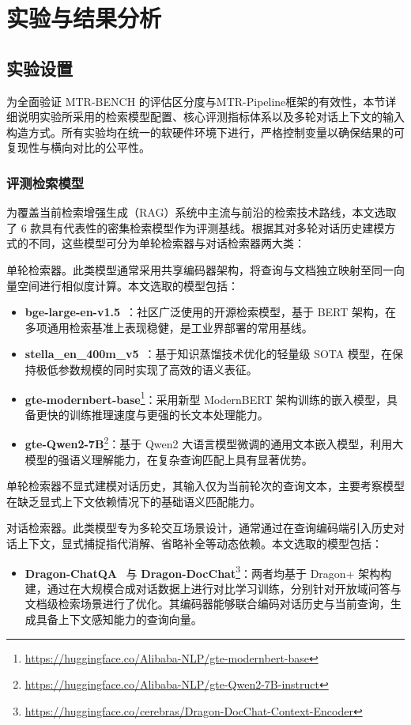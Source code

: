 \chapter{实验与结果分析}

\section{实验设置}
\label{sec:exp_setup}

为全面验证 MTR-BENCH 的评估区分度与MTR-Pipeline框架的有效性，本节详细说明实验所采用的检索模型配置、核心评测指标体系以及多轮对话上下文的输入构造方式。所有实验均在统一的软硬件环境下进行，严格控制变量以确保结果的可复现性与横向对比的公平性。

\subsection{评测检索模型}

为覆盖当前检索增强生成（RAG）系统中主流与前沿的检索技术路线，本文选取了 6 款具有代表性的密集检索模型作为评测基线。根据其对多轮对话历史建模方式的不同，这些模型可分为单轮检索器与对话检索器两大类：

单轮检索器。此类模型通常采用共享编码器架构，将查询与文档独立映射至同一向量空间进行相似度计算。本文选取的模型包括：
\begin{itemize}
    \item \textbf{bge-large-en-v1.5}~\citep{xiao2023cpack}：社区广泛使用的开源检索模型，基于 BERT 架构，在多项通用检索基准上表现稳健，是工业界部署的常用基线。
    \item \textbf{stella\_en\_400m\_v5}~\citep{Zhang2024JasperAS}：基于知识蒸馏技术优化的轻量级 SOTA 模型，在保持极低参数规模的同时实现了高效的语义表征。
    \item \textbf{gte-modernbert-base}\footnote{\url{https://huggingface.co/Alibaba-NLP/gte-modernbert-base}}：采用新型 ModernBERT 架构训练的嵌入模型，具备更快的训练推理速度与更强的长文本处理能力。
    \item \textbf{gte-Qwen2-7B}\footnote{\url{https://huggingface.co/Alibaba-NLP/gte-Qwen2-7B-instruct}}：基于 Qwen2 大语言模型微调的通用文本嵌入模型，利用大模型的强语义理解能力，在复杂查询匹配上具有显著优势。
\end{itemize}

单轮检索器不显式建模对话历史，其输入仅为当前轮次的查询文本，主要考察模型在缺乏显式上下文依赖情况下的基础语义匹配能力。

对话检索器。此类模型专为多轮交互场景设计，通常通过在查询编码端引入历史对话上下文，显式捕捉指代消解、省略补全等动态依赖。本文选取的模型包括：
\begin{itemize}
    \item \textbf{Dragon-ChatQA}~\citep{Liu2024ChatQASG} 与 \textbf{Dragon-DocChat}\footnote{\url{https://huggingface.co/cerebras/Dragon-DocChat-Context-Encoder}}：两者均基于 Dragon+ 架构构建，通过在大规模合成对话数据上进行对比学习训练，分别针对开放域问答与文档级检索场景进行了优化。其编码器能够联合编码对话历史与当前查询，生成具备上下文感知能力的查询向量。
\end{itemize}

